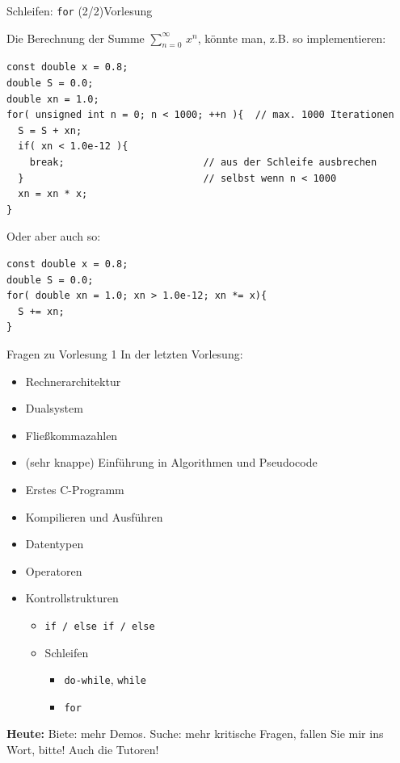 \documentclass[xcolor=dvipsnames]{beamer}
\newcounter{lecturecounter}
\begin{document}
\begin{frame}[fragile]{Schleifen: \texttt{for} (2/2)}{Vorlesung }
\begin{block}{}
Die Berechnung der Summe $\sum_{n=0}^{\infty} \, x^n$, könnte man, z.B. so implementieren:
\end{block}
\begin{lstlisting}
const double x = 0.8;
double S = 0.0;
double xn = 1.0;
for( unsigned int n = 0; n < 1000; ++n ){  // max. 1000 Iterationen
  S = S + xn;
  if( xn < 1.0e-12 ){
    break;                        // aus der Schleife ausbrechen
  }                               // selbst wenn n < 1000
  xn = xn * x;
}
\end{lstlisting}

\begin{block}{}
Oder aber auch so:
\end{block}
\begin{lstlisting}
const double x = 0.8;
double S = 0.0;
for( double xn = 1.0; xn > 1.0e-12; xn *= x){
  S += xn;
}
\end{lstlisting}
\end{frame}


\begin{frame}{Fragen zu Vorlesung 1}
  In der letzten Vorlesung:
  \begin{itemize}
    \item{Rechnerarchitektur}
    \item{Dualsystem}
    \item{Fließkommazahlen}
    \item{(sehr knappe) Einführung in Algorithmen und Pseudocode}
    \item{Erstes C-Programm}
    \item{Kompilieren und Ausführen}
    \item{Datentypen}
    \item{Operatoren}
    \item{Kontrollstrukturen}
    \begin{itemize}
      \item{\texttt{if / else if / else}}
      \item{Schleifen}
      \begin{itemize}
        \item{\texttt{do-while}, \texttt{while}}
        \item{\texttt{for}}
      \end{itemize}
    \end{itemize}
  \end{itemize}
  \textbf{Heute:} Biete: mehr Demos. Suche: mehr kritische Fragen, fallen Sie mir ins Wort, bitte! Auch die Tutoren!
\end{frame}
\end{document}

